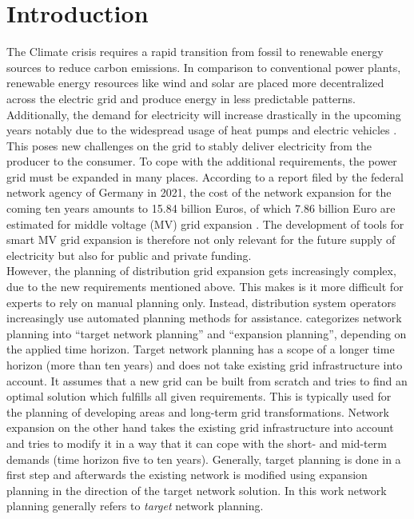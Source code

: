 \chapter{Introduction}\label{chap:introduction}

The Climate crisis requires a rapid transition from fossil to renewable energy sources to reduce carbon emissions. In comparison to conventional power plants, renewable energy resources like wind and solar are placed more decentralized across the electric grid and produce energy in less predictable patterns. Additionally, the demand for electricity will increase drastically in the upcoming years notably due to the widespread usage of heat pumps and electric vehicles \cite{brutto_stromverbrauch}. This poses new challenges on the grid to stably deliver electricity from the producer to the consumer. To cope with the additional requirements, the power grid must be expanded in many places. According to a report filed by the federal network agency of Germany in 2021, the cost of the network expansion for the coming ten years amounts to 15.84 billion Euros, of which 7.86 billion Euro are estimated for middle voltage (MV) grid expansion \cite{Ausbaubericht_2021_page14}. The development of tools for smart MV grid expansion is therefore not only relevant for the future supply of electricity but also for public and private funding. \\
However, the planning of distribution grid expansion gets increasingly complex, due to the new requirements mentioned above. This makes is it more difficult for experts to rely on manual planning only. Instead, distribution system operators increasingly use automated planning methods for assistance.
\cite{rotering2013zielnetzplanung} categorizes network planning into “target network planning” and “expansion planning”, depending on the applied time horizon. Target network planning has a scope of a longer time horizon (more than ten years) and does not take existing grid infrastructure into account. It assumes that a new grid can be built from scratch and tries to find an optimal solution which fulfills all given requirements. This is typically used for the planning of developing areas and long-term grid transformations. Network expansion on the other hand takes the existing grid infrastructure into account and tries to modify it in a way that it can cope with the short- and mid-term demands (time horizon five to ten years). Generally, target planning is done in a first step and afterwards the existing network is modified using expansion planning in the direction of the target network solution. In this work network planning generally refers to \textit{target} network planning.\\
